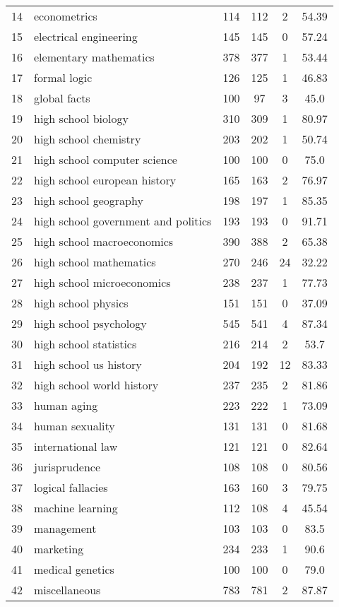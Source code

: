 \documentclass[11pt]{article}
\begin{document}
\begin{table*}
{\begin{tabular}{llcccc}
14 & econometrics & 114 & 112 & 2 & 54.39\\
15 & electrical engineering & 145 & 145 & 0 & 57.24\\
16 & elementary mathematics & 378 & 377 & 1 & 53.44\\
17 & formal logic & 126 & 125 & 1 & 46.83\\
18 & global facts & 100 & 97 & 3 & 45.0\\
19 & high school biology & 310 & 309 & 1 & 80.97\\
20 & high school chemistry & 203 & 202 & 1 & 50.74\\
21 & high school computer science & 100 & 100 & 0 & 75.0\\
22 & high school european history & 165 & 163 & 2 & 76.97\\
23 & high school geography & 198 & 197 & 1 & 85.35\\
24 & high school government and politics & 193 & 193 & 0 & 91.71\\
25 & high school macroeconomics & 390 & 388 & 2 & 65.38\\
26 & high school mathematics & 270 & 246 & 24 & 32.22\\
27 & high school microeconomics & 238 & 237 & 1 & 77.73\\
28 & high school physics & 151 & 151 & 0 & 37.09\\
29 & high school psychology & 545 & 541 & 4 & 87.34\\
30 & high school statistics & 216 & 214 & 2 & 53.7\\
31 & high school us history & 204 & 192 & 12 & 83.33\\
32 & high school world history & 237 & 235 & 2 & 81.86\\
33 & human aging & 223 & 222 & 1 & 73.09\\
34 & human sexuality & 131 & 131 & 0 & 81.68\\
35 & international law & 121 & 121 & 0 & 82.64\\
36 & jurisprudence & 108 & 108 & 0 & 80.56\\
37 & logical fallacies & 163 & 160 & 3 & 79.75\\
38 & machine learning & 112 & 108 & 4 & 45.54\\
39 & management & 103 & 103 & 0 & 83.5\\
40 & marketing & 234 & 233 & 1 & 90.6\\
41 & medical genetics & 100 & 100 & 0 & 79.0\\
42 & miscellaneous & 783 & 781 & 2 & 87.87\\

\end{tabular}}
\end{table*}
\end{document}

